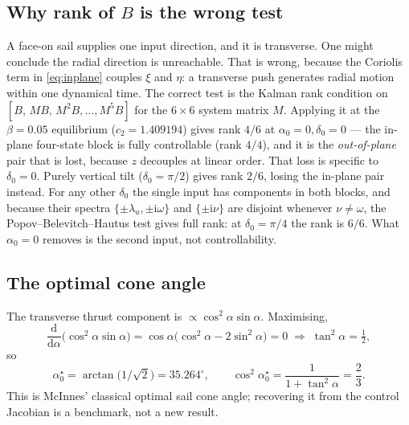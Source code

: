 \documentclass[11pt,a4paper]{article}
\begin{document}
\subsection{Why rank of \texorpdfstring{$B$}{B} is the wrong test}

A face-on sail supplies one input direction, and it is transverse. One might
conclude the radial direction is unreachable. That is wrong, because the
Coriolis term in \eqref{eq:inplane} couples $\xi$ and $\eta$: a transverse push
generates radial motion within one dynamical time. The correct test is the
Kalman rank condition on $[B,\,MB,\,M^2B,\dots,M^5B]$ for the $6\times6$ system
matrix $M$. Applying it at the $\beta=0.05$ equilibrium ($c_2=1.409194$) gives
rank $4/6$ at $\alpha_0=0,\delta_0=0$ --- the in-plane four-state block is fully
controllable (rank $4/4$), and it is the \emph{out-of-plane} pair that is lost,
because $z$ decouples at linear order. That loss is specific to $\delta_0=0$.
Purely vertical tilt ($\delta_0=\pi/2$) gives rank $2/6$, losing the in-plane
pair instead. For any other $\delta_0$ the single input has components in both
blocks, and because their spectra $\{\pm\lambda_u,\pm\mathrm{i}\omega\}$ and
$\{\pm\mathrm{i}\nu\}$ are disjoint whenever $\nu\neq\omega$, the
Popov--Belevitch--Hautus test gives full rank: at $\delta_0=\pi/4$ the rank is
$6/6$. What $\alpha_0=0$ removes is the second input, not controllability.

\subsection{The optimal cone angle}

The transverse thrust component is $\propto\cos^2\!\alpha\sin\alpha$. Maximising,
\begin{equation}
  \frac{\mathrm{d}}{\mathrm{d}\alpha}\bigl(\cos^2\!\alpha\sin\alpha\bigr)
  = \cos\alpha\bigl(\cos^2\!\alpha-2\sin^2\!\alpha\bigr) = 0
  \;\Longrightarrow\;
  \tan^2\!\alpha=\tfrac12 ,
\end{equation}
so
\begin{equation}
  \alpha_0^\star=\arctan\bigl(1/\sqrt2\bigr)=35.264^\circ,
  \qquad
  \cos^2\!\alpha_0^\star=\frac{1}{1+\tan^2\!\alpha}=\frac23 .
\end{equation}
This is McInnes' classical optimal sail cone angle; recovering it from the
control Jacobian is a benchmark, not a new result.
\end{document}
